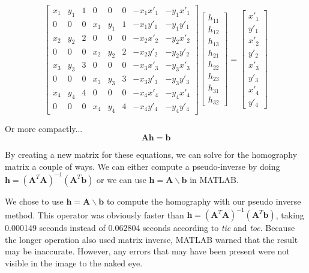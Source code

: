 \documentclass[11pt, letterpaper]{article}
\begin{document}
\[
\begin{bmatrix}
  x_1 & y_1 & 1 & 0 & 0 & 0 & -x_1x'_1 & -y_1x'_1 \\
  0 & 0 & 0 & x_1 & y_1 & 1 & -x_1y'_1 & -y_1y'_1 \\
  x_2 & y_2 & 2 & 0 & 0 & 0 & -x_2x'_2 & -y_2x'_2 \\
  0 & 0 & 0 & x_2 & y_2 & 2 & -x_2y'_2 & -y_2y'_2 \\
  x_3 & y_3 & 3 & 0 & 0 & 0 & -x_3x'_3 & -y_3x'_3 \\
  0 & 0 & 0 & x_3 & y_3 & 3 & -x_3y'_3 & -y_3y'_3 \\
  x_4 & y_4 & 4 & 0 & 0 & 0 & -x_4x'_4 & -y_4x'_4 \\
  0 & 0 & 0 & x_4 & y_4 & 4 & -x_4y'_4 & -y_4y'_4 
\end{bmatrix}
\begin{bmatrix}
  h_{11} \\ h_{12} \\ h_{13} \\ h_{21} \\ h_{22} \\ h_{23} \\ h_{31} \\ h_{32} 
\end{bmatrix}
=
\begin{bmatrix}
  x'_1 \\ y'_1 \\ x'_2 \\ y'_2 \\ x'_3 \\ y'_3 \\ x'_4 \\ y'_4
\end{bmatrix}
\]

Or more compactly...
\[
\mathbf{A}\mathbf{h}=\mathbf{b}
\]

By creating a new matrix for these equations, we can solve for the
homography matrix a couple of ways. We can either compute a
pseudo-inverse by doing
$\mathbf{h}=(\mathbf{A}^T\mathbf{A})^{-1}(\mathbf{A}^T\mathbf{b})$ or
we can use $\mathbf{h}=\mathbf{A}\backslash\mathbf{b}$ in MATLAB.

We chose to use $\mathbf{h}=\mathbf{A}\backslash\mathbf{b}$ to compute
the homography with our pseudo inverse method. This operator was
obviously faster than
$\mathbf{h}=(\mathbf{A}^T\mathbf{A})^{-1}(\mathbf{A}^T\mathbf{b})$,
taking 0.000149 seconds instead of 0.062804 seconds according to
\emph{tic} and \emph{toc}. Because the longer operation also used
matrix inverse, MATLAB warned that the result may be
inaccurate. However, any errors that may have been present were not
visible in the image to the naked eye.
\end{document}
